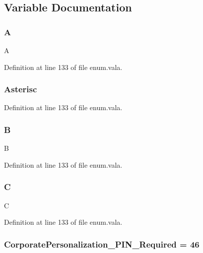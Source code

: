 \subsection{Variable Documentation}
\hypertarget{enum_8vala_a3b98e2dffc6cb06a89dcb0d5c60a0206}{
\subsubsection[{A}]{\setlength{\rightskip}{0pt plus 5cm}A}}\label{enum_8vala_a3b98e2dffc6cb06a89dcb0d5c60a0206}
A 

Definition at line 133 of file enum.\-vala.

\hypertarget{enum_8vala_a96eda96ce5ad0c1d1b6588690e70b48b}{
\subsubsection[{Asterisc}]{\setlength{\rightskip}{0pt plus 5cm}Asterisc}}\label{enum_8vala_a96eda96ce5ad0c1d1b6588690e70b48b}

\begin{DoxyItemize}
\item 
\end{DoxyItemize}

Definition at line 133 of file enum.\-vala.

\hypertarget{enum_8vala_a9d3d9048db16a7eee539e93e3618cbe7}{
\subsubsection[{B}]{\setlength{\rightskip}{0pt plus 5cm}B}}\label{enum_8vala_a9d3d9048db16a7eee539e93e3618cbe7}
B 

Definition at line 133 of file enum.\-vala.

\hypertarget{enum_8vala_aaa53ca0b650dfd85c4f59fa156f7a2cc}{
\subsubsection[{C}]{\setlength{\rightskip}{0pt plus 5cm}C}}\label{enum_8vala_aaa53ca0b650dfd85c4f59fa156f7a2cc}
C 

Definition at line 133 of file enum.\-vala.

\hypertarget{enum_8vala_ac770e4941e5a9f1d05516c55bf8b7693}{
\subsubsection[{Corporate\-Personalization\-\_\-\-P\-I\-N\-\_\-\-Required}]{\setlength{\rightskip}{0pt plus 5cm}Corporate\-Personalization\-\_\-\-P\-I\-N\-\_\-\-Required = 46}}\label{enum_8vala_ac770e4941e5a9f1d05516c55bf8b7693}


